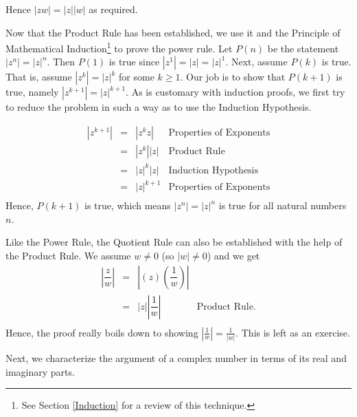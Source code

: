 Hence $|zw| = |z| |w|$ as required.  

\smallskip

Now that the Product Rule has been established, we use it and the Principle of Mathematical Induction\footnote{See Section \ref{Induction} for a review of this technique.} to 	prove the power rule.  Let $P(n)$ be the statement $\left|z^{n}\right| = |z|^n$.  Then $P(1)$ is true since $\left|z^{1}\right| = |z| = |z|^1$.  Next, assume $P(k)$ is true.  That is, assume $\left|z^{k}\right| = |z|^k$ for some $k \geq 1$.  Our job is to show that $P(k+1)$ is true, namely $\left|z^{k+1}\right| = |z|^{k+1}$.  As is customary with induction proofs, we first try to reduce the problem in such a way as to  use the Induction Hypothesis.

\[\begin{array}{rcll}
\left|z^{k+1}\right| & = & \left|z^{k} z\right| & \text{Properties of Exponents} \\[3pt]
										 & = & \left|z^{k}\right| |z| & \text{Product Rule} \\[3pt]
										 & = &  |z|^{k} |z| & \text{Induction Hypothesis} \\[3pt]
										 & = &  |z|^{k+1} & \text{Properties of Exponents} \\ \end{array} \]
Hence, $P(k+1)$ is true, which means $\left|z^{n}\right| = |z|^{n}$ is true for all natural numbers $n$.  

\smallskip

Like the Power Rule, the Quotient Rule can also be established with the help of the Product Rule. We assume $w \neq 0$ (so $|w| \neq 0$) and we get
\[ \begin{array}{rcll}

\left| \dfrac{z}{w} \right| &  = & \left| (z) \left( \dfrac{1}{w} \right) \right| & \\ [7pt] 
										        & = & |z| \left| \dfrac{1}{w}\right| & \text{Product Rule.} \\ \end{array} \]
Hence, the proof really boils down to showing $\left| \frac{1}{w} \right| = \frac{1}{|w|}$.  This is left as an exercise.

\smallskip

Next, we characterize the argument of a complex number in terms of its real and imaginary parts.


